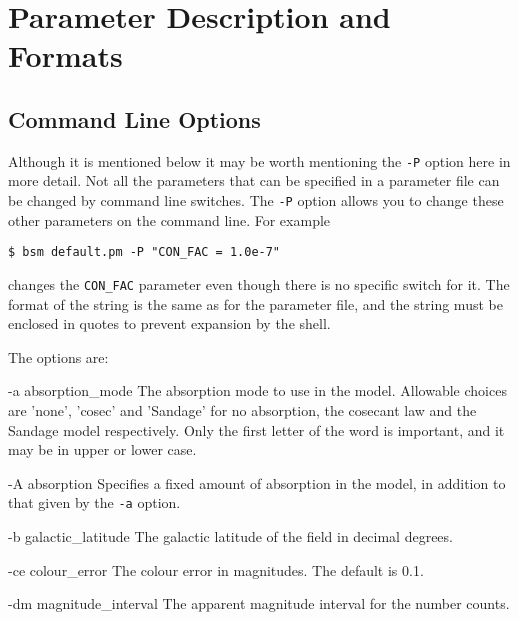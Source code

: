\documentclass[11pt,twoside]{article}
\begin{document}
\section{Parameter Description and Formats}
 
\subsection{Command Line Options}

Although it is mentioned below it may be worth mentioning the {\tt -P} option
here in more detail. Not all the parameters that can be specified in a 
parameter file can be changed by command line switches. The {\tt -P} option 
allows you to change these other parameters on the command line. For example
\begin{verbatim}
$ bsm default.pm -P "CON_FAC = 1.0e-7"
\end{verbatim}
changes the {\tt CON\_FAC} parameter even though there is no specific switch
for it. The format of the string is the same as for the parameter file, and the
string must be enclosed in quotes to prevent expansion by the shell.

The options are:
\medskip

\begin{clo}{-a absorption\_mode}
The absorption mode to use in the model. Allowable choices are 'none', 'cosec'
and 'Sandage' for no absorption, the cosecant law and the Sandage model
respectively. Only the first letter of the word is important, and it may 
be in upper or lower case.
\end{clo}

\begin{clo}{-A absorption}
Specifies a fixed amount of absorption in the model, in addition to that
given by the {\tt -a} option.
\end{clo}

\begin{clo}{-b galactic\_latitude}
The galactic latitude of the field in decimal degrees.
\end{clo}

\begin{clo}{-ce colour\_error}
The colour error in magnitudes. The default is 0.1.
\end{clo}
  
\begin{clo}{-dm magnitude\_interval}
The apparent magnitude interval for the number counts.
\end{clo}
\end{document}
